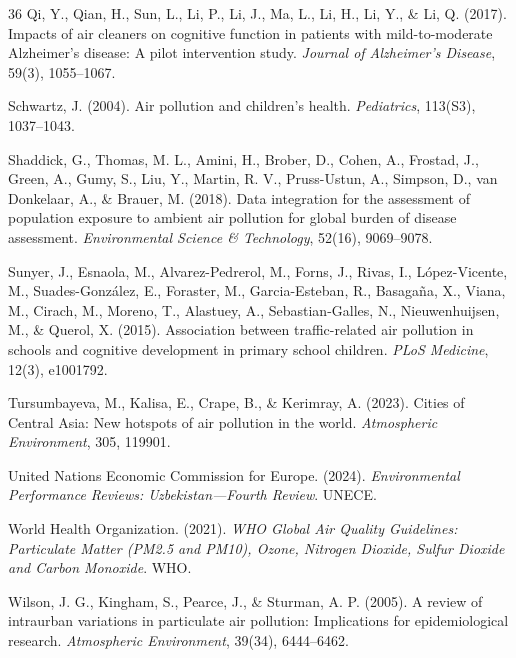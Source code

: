 \documentclass[11pt,a4paper]{article}
\begin{document}
\begin{thebibliography}{36}
Qi, Y., Qian, H., Sun, L., Li, P., Li, J., Ma, L., Li, H., Li, Y., \& Li, Q. (2017). Impacts of air cleaners on cognitive function in patients with mild-to-moderate Alzheimer's disease: A pilot intervention study. \textit{Journal of Alzheimer's Disease}, 59(3), 1055--1067.

Schwartz, J. (2004). Air pollution and children's health. \textit{Pediatrics}, 113(S3), 1037--1043.

Shaddick, G., Thomas, M. L., Amini, H., Brober, D., Cohen, A., Frostad, J., Green, A., Gumy, S., Liu, Y., Martin, R. V., Pruss-Ustun, A., Simpson, D., van Donkelaar, A., \& Brauer, M. (2018). Data integration for the assessment of population exposure to ambient air pollution for global burden of disease assessment. \textit{Environmental Science \& Technology}, 52(16), 9069--9078.

Sunyer, J., Esnaola, M., Alvarez-Pedrerol, M., Forns, J., Rivas, I., L\'opez-Vicente, M., Suades-Gonz\'alez, E., Foraster, M., Garcia-Esteban, R., Basaga\~na, X., Viana, M., Cirach, M., Moreno, T., Alastuey, A., Sebastian-Galles, N., Nieuwenhuijsen, M., \& Querol, X. (2015). Association between traffic-related air pollution in schools and cognitive development in primary school children. \textit{PLoS Medicine}, 12(3), e1001792.

Tursumbayeva, M., Kalisa, E., Crape, B., \& Kerimray, A. (2023). Cities of Central Asia: New hotspots of air pollution in the world. \textit{Atmospheric Environment}, 305, 119901.

United Nations Economic Commission for Europe. (2024). \textit{Environmental Performance Reviews: Uzbekistan---Fourth Review}. UNECE.

World Health Organization. (2021). \textit{WHO Global Air Quality Guidelines: Particulate Matter (PM2.5 and PM10), Ozone, Nitrogen Dioxide, Sulfur Dioxide and Carbon Monoxide}. WHO.

Wilson, J. G., Kingham, S., Pearce, J., \& Sturman, A. P. (2005). A review of intraurban variations in particulate air pollution: Implications for epidemiological research. \textit{Atmospheric Environment}, 39(34), 6444--6462.


\end{thebibliography}
\end{document}
